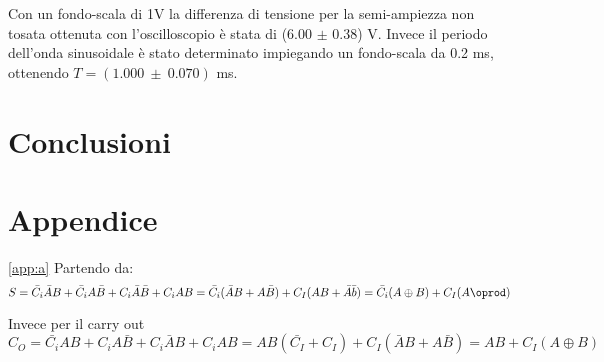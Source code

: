 \documentclass[a4paper,11pt]{article}
\begin{document}
	Con un fondo-scala di 1V la differenza di tensione per la semi-ampiezza non tosata ottenuta con l'oscilloscopio è stata di (6.00 $\pm$ 0.38) V. Invece il periodo dell'onda sinusoidale è stato determinato impiegando un fondo-scala da 0.2 ms, ottenendo $T = (1.000 \ \pm\ 0.070)$ ms.
	
	
	
	\section{Conclusioni}
	
	\section{Appendice} \ref{app:a}
	Partendo da:
	\begin{equation}
		S= \bar{C_i}\bar{A}B +\bar{C_i}A\bar{B}+C_i\bar{A}\bar{B}+C_iAB = \bar{C_i}(\bar{A}B+A\bar{B})+ C_I(AB+ \bar{A}\bar{b})= \bar{C_i}(A \oplus B)+ C_I(A \oprod)
	\end{equation}

	
	Invece per il carry out
	\begin{equation}
		C_O= \bar{C_i}AB +C_iA\bar{B}+C_i\bar{A}B+C_iAB = AB(\bar{C_I}+C_I)+C_I(\bar{A}B+A\bar{B})=AB+C_I(A \oplus B)
	\end{equation}
	
	\medskip
	
	\printbibliography
	
\end{document}
